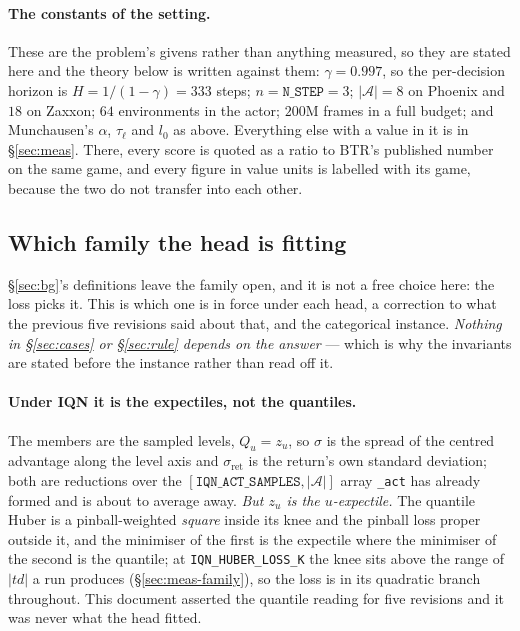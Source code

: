 \documentclass{article}
\newcommand{\actions}{\mathcal{A}}
\newcommand{\sret}{\sigma_{\mathrm{ret}}}
\newcommand{\srank}{\sigma}
\begin{document}
\paragraph{The constants of the setting.} These are the problem's givens rather than anything
measured, so they are stated here and the theory below is written against them: $\gamma = 0.997$,
so the per-decision horizon is $H = 1/(1-\gamma) = 333$ steps; $n = \texttt{N\_STEP} = 3$;
$|\actions| = 8$ on Phoenix and $18$ on Zaxxon; $64$ environments in the actor; $200$M frames in
a full budget; and Munchausen's $\alpha$, $\tau_\ell$ and $l_0$ as above. Everything else with a
value in it is in \S\ref{sec:meas}. There, every score is quoted as a ratio to BTR's published
number on the same game, and every figure in value units is labelled with its game, because the
two do not transfer into each other.

\subsection{Which family the head is fitting}
\label{sec:family}

\S\ref{sec:bg}'s definitions leave the family open, and it is not a free choice here: the loss
picks it. This is which one is in force under each head, a correction to what the previous five
revisions said about that, and the categorical instance. \emph{Nothing in \S\ref{sec:cases} or
\S\ref{sec:rule} depends on the answer} --- which is why the invariants are stated before the
instance rather than read off it.

\paragraph{Under IQN it is the expectiles, not the quantiles.} The members are the sampled
levels, $Q_u = z_u$, so $\srank$ is the spread of the centred advantage along the level axis and
$\sret$ is the return's own standard deviation; both are reductions over the
$[\texttt{IQN\_ACT\_SAMPLES}, |\actions|]$ array \texttt{\_act} has already formed and is about
to average away. \emph{But $z_u$ is the $u$-expectile.} The quantile Huber is a pinball-weighted
\emph{square} inside its knee and the pinball loss proper outside it, and the minimiser of the
first is the expectile where the minimiser of the second is the quantile; at
\texttt{IQN\_HUBER\_LOSS\_K} the knee sits above the range of $|td|$ a run produces
(\S\ref{sec:meas-family}), so the loss is in its quadratic branch throughout. This document
asserted the quantile reading for five revisions and it was never what the head fitted.
\end{document}
